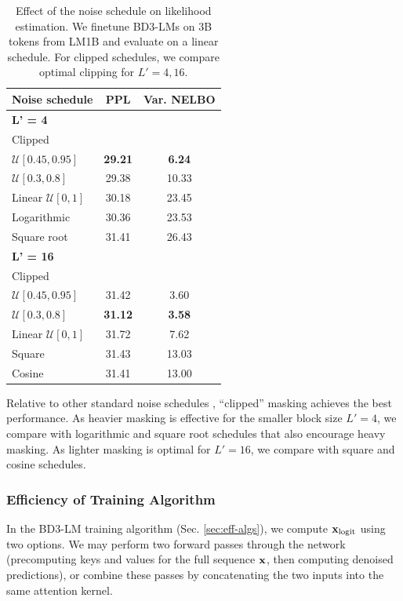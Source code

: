 \documentclass{article} %
\def\algos{BD3-LMs}
\def\algo{BD3-LM}
\begin{document}
\begin{table}
  \vspace{-13pt}
  \small
  \caption{Effect of the noise schedule on likelihood estimation. We finetune \algos{} on 3B tokens from LM1B and evaluate on a linear schedule. For clipped schedules, we compare optimal clipping for \(L' = 4, 16\).}
  \vspace{-8pt}
  \label{tab:var_ns_training}
  \centering
  \begin{tabular}{lcc}
    \toprule
    Noise schedule & PPL & Var. NELBO \\
    \midrule
    \textbf{L' = 4} &&\\
    Clipped &&\\
    \quad \(\mathcal{U}[0.45, 0.95]\) & \textbf{29.21} & \textbf{6.24} \\
    \quad \(\mathcal{U}[0.3, 0.8]\) & 29.38 & 10.33 \\
    Linear \(\mathcal{U}[0,1]\) & 30.18 & 23.45 \\
    Logarithmic & 30.36 & 23.53 \\
    Square root & 31.41 & 26.43 \\
    \midrule
    \textbf{L' = 16} &&\\
    Clipped &&\\
    \quad \(\mathcal{U}[0.45, 0.95]\) & 31.42 & 3.60 \\
    \quad \(\mathcal{U}[0.3, 0.8]\) & \textbf{31.12} & \textbf{3.58} \\
    Linear \(\mathcal{U}[0,1]\) & 31.72 & 7.62 \\
    Square & 31.43 & 13.03 \\
    Cosine & 31.41 & 13.00 \\
    \bottomrule
  \end{tabular}
  \vspace{-40pt}
\end{table}

Relative to other standard noise schedules \citep{chang2022maskgit}, ``clipped'' masking achieves the best performance. As heavier masking is effective for the smaller block size $L'=4$, we compare with logarithmic and square root schedules that also encourage heavy masking. As lighter masking is optimal for $L'=16$, we compare with square and cosine schedules.



\subsubsection*{Efficiency of Training Algorithm}
In the \algo{} training algorithm (Sec. \ref{sec:eff-algs}), we compute ${\mathbf x}_{\text{logit}}$ using two options. We may perform two forward passes through the network (precomputing keys and values for the full sequence ${\mathbf x}$, then computing denoised predictions), or combine these passes by concatenating the two inputs into the same attention kernel.
\end{document}
